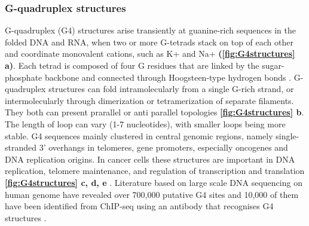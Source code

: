  \subsubsection{G-quadruplex structures}
G-quadruplex (G4) structures arise transiently at guanine-rich sequences in the folded DNA and RNA, when two or more G-tetrads stack on top of each other and coordinate monovalent cations, such as K+ and Na+ \cite{sen1990sodium} \textbf{(\autoref{fig:G4structures} a)}. Each tetrad is composed of four G residues that are linked by the sugar-phosphate backbone and connected through Hoogsteen-type hydrogen bonds \cite{kwok2017g}. G-quadruplex structures can fold intramolecularly from a single G-rich strand, or intermolecularly through dimerization or tetramerization of separate filaments. They both can present prarallel or anti parallel topologies \textbf{\autoref{fig:G4structures} b}. The length of loop can vary (1-7 nucleotides), with smaller loops being more stable\cite{huppert2010structure}.
G4 sequences mainly clustered in central genomic regions, namely single-stranded 3' overhangs in telomeres, gene promoters, especially oncogenes and DNA replication origins. In cancer cells these structures are important in DNA replication, telomere maintenance, and regulation of transcription and translation \textbf{\autoref{fig:G4structures} c, d, e} \cite{rhodes2015g, maizels2013g4}. Literature based on large scale DNA sequencing on human genome have revealed over 700,000 putative G4 sites and 10,000 of them have been identified from ChIP-seq using an antibody that recognises G4 structures \cite{siddiqui2002direct, granotier2005preferential, chambers2015high, hansel2016g}.

